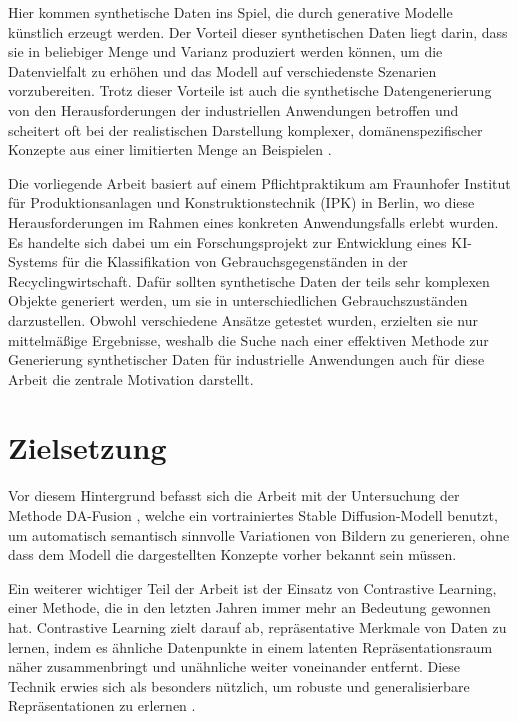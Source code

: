 Hier kommen synthetische Daten ins Spiel, die durch generative Modelle künstlich erzeugt werden. Der Vorteil dieser synthetischen Daten liegt darin, dass sie in beliebiger Menge und Varianz produziert werden können, um die Datenvielfalt zu erhöhen und das Modell auf verschiedenste Szenarien vorzubereiten. Trotz dieser Vorteile ist auch die synthetische Datengenerierung von den Herausforderungen der industriellen Anwendungen betroffen und scheitert oft bei der realistischen Darstellung komplexer, domänenspezifischer Konzepte aus einer limitierten Menge an Beispielen \parencite{Lu2024syntheticdatareview}.

Die vorliegende Arbeit basiert auf einem Pflichtpraktikum am Fraunhofer Institut für Produktionsanlagen und Konstruktionstechnik (IPK) in Berlin, wo diese Herausforderungen im Rahmen eines konkreten Anwendungsfalls erlebt wurden. Es handelte sich dabei um ein Forschungsprojekt zur Entwicklung eines KI-Systems für die Klassifikation von Gebrauchsgegenständen in der Recyclingwirtschaft. Dafür sollten synthetische Daten der teils sehr komplexen Objekte generiert werden, um sie in unterschiedlichen Gebrauchszuständen darzustellen. Obwohl verschiedene Ansätze getestet wurden, erzielten sie nur mittelmäßige Ergebnisse, weshalb die Suche nach einer effektiven Methode zur Generierung synthetischer Daten für industrielle Anwendungen auch für diese Arbeit die zentrale Motivation darstellt.

\section{Zielsetzung} \label{sec:goal}

Vor diesem Hintergrund befasst sich die Arbeit mit der Untersuchung der Methode DA-Fusion \parencite{Trabucco2023dafusion}, welche ein vortrainiertes Stable Diffusion-Modell benutzt, um automatisch semantisch sinnvolle Variationen von Bildern zu generieren, ohne dass dem Modell die dargestellten Konzepte vorher bekannt sein müssen.

Ein weiterer wichtiger Teil der Arbeit ist der Einsatz von Contrastive Learning, einer Methode, die in den letzten Jahren immer mehr an Bedeutung gewonnen hat. Contrastive Learning zielt darauf ab, repräsentative Merkmale von Daten zu lernen, indem es ähnliche Datenpunkte in einem latenten Repräsentationsraum näher zusammenbringt und unähnliche weiter voneinander entfernt. Diese Technik erwies sich als besonders nützlich, um robuste und generalisierbare Repräsentationen zu erlernen \parencite{Liu2021understandimprovecontrastivelearning}.

